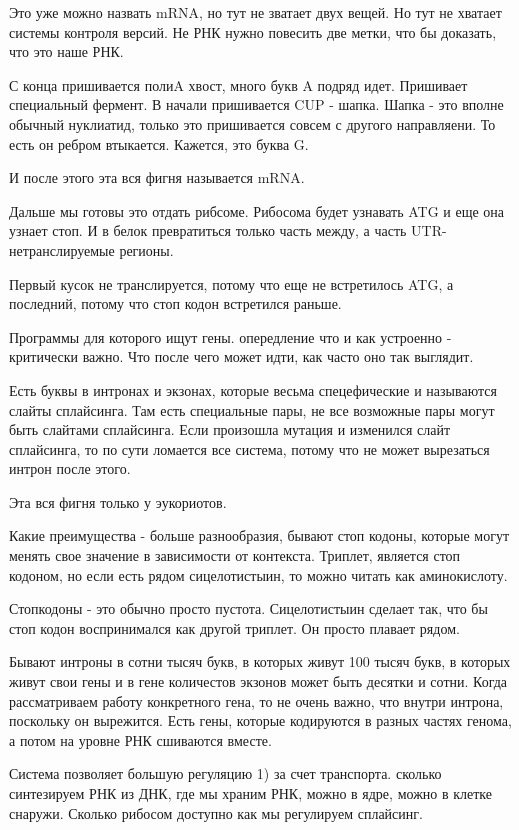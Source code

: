 Это уже можно назвать mRNA, но тут не зватает двух вещей. Но тут 
не хватает системы контроля версий. Не РНК нужно повесить две метки, что 
бы доказать, что это наше РНК. 

С конца пришивается полиA хвост, много букв A подряд идет. Пришивает 
специальный фермент. В начали пришивается CUP - шапка. Шапка - это 
вполне обычный нуклиатид, только это пришивается совсем с другого 
направляени. То есть он ребром втыкается. Кажется, это буква G. 

И после этого эта вся фигня называется mRNA. 

Дальше мы готовы это отдать рибсоме. Рибосома будет 
узнавать ATG и еще она узнает стоп. И в белок превратиться только 
часть между, а часть UTR- нетранслируемые регионы. 

Первый кусок не транслируется, потому что еще не встретилось ATG, 
а последний, потому что стоп кодон встретился раньше. 

Программы для которого ищут гены. опередление что и как 
устроенно - критически важно. Что после чего может идти, 
как часто оно так выглядит. 

Есть буквы в интронах и экзонах, которые весьма спецефические и 
называются слайты сплайсинга. Там есть специальные пары, не все возможные 
пары могут быть слайтами сплайсинга. Если произошла мутация и изменился 
слайт сплайсинга, то по сути ломается все система, потому что 
не может вырезаться интрон после этого. 

Эта вся фигня только у эукориотов. 

Какие преимущества - больше разнообразия, 
бывают стоп кодоны, которые могут менять свое значение в зависимости от контекста. 
Триплет, является стоп кодоном, но если есть 
рядом сицелотистыин, то можно читать как аминокислоту. 

Стопкодоны - это обычно просто пустота. Сицелотистыин сделает так, что бы
стоп кодон воспринимался как другой триплет. Он просто плавает рядом. 

Бывают интроны в сотни тысяч букв, в которых живут 100 тысяч букв, в которых 
живут свои гены и в гене количестов экзонов может быть десятки и сотни. Когда рассматриваем 
работу конкретного гена, то не очень важно, что внутри интрона, 
поскольку он вырежится. Есть гены, которые кодируются в разных частях 
генома, а потом на уровне РНК сшиваются вместе. 

Система позволяет большую регуляцию 1) за счет транспорта. 
сколько синтезируем РНК из ДНК, где мы храним РНК, можно в ядре, можно 
в клетке снаружи. Сколько рибосом доступно как мы регулируем сплайсинг. 

